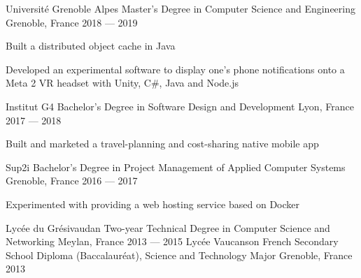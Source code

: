 

\begin{cventries}

  \cventry
    {Université Grenoble Alpes} %
    {Master's Degree in Computer Science and Engineering} %
    {Grenoble, France} %
    {2018 — 2019} %
    {
      \begin{cvitems} %
        \item {Built a distributed object cache in Java}
        \item {Developed an experimental software to display one's phone notifications onto a Meta 2 VR headset with Unity, C\#, Java and Node.js}
      \end{cvitems}
    }
  \cventry
    {Institut G4} %
    {Bachelor's Degree in Software Design and Development} %
    {Lyon, France} %
    {2017 — 2018} %
    {
      \begin{cvitems} %
        \item {Built and marketed a travel-planning and cost-sharing native mobile app}
      \end{cvitems}
    }
  \cventry
    {Sup2i} %
    {Bachelor's Degree in Project Management of Applied Computer Systems} %
    {Grenoble, France} %
    {2016 — 2017} %
    {
      \begin{cvitems} %
        \item {Experimented with providing a web hosting service based on Docker}
      \end{cvitems}
    }
  \cventryy
    {Lycée du Grésivaudan} %
    {Two-year Technical Degree in Computer Science and Networking} %
    {Meylan, France} %
    {2013 — 2015} %
  \cventryy
    {Lycée Vaucanson} %
    {French Secondary School Diploma (Baccalauréat), Science and Technology Major} %
    {Grenoble, France} %
    {2013} %
\end{cventries}
